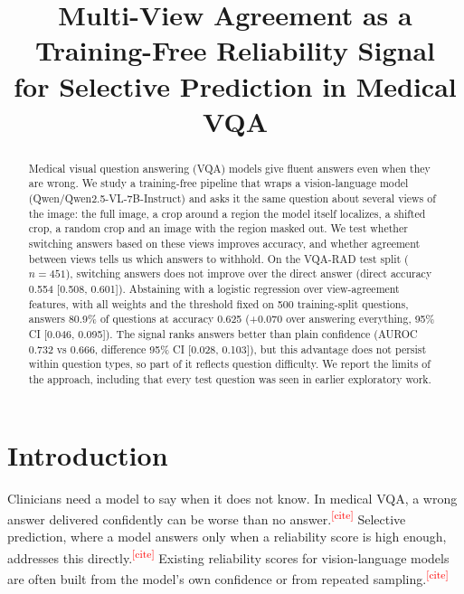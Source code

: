 \documentclass[11pt]{article}
\title{Multi-View Agreement as a Training-Free Reliability Signal\\for Selective Prediction in Medical VQA}
\author{\todo{authors and affiliations}}
\date{}
\newcommand{\needcite}{\textcolor{red}{\textsuperscript{[cite]}}}
\begin{document}
\maketitle

\begin{abstract}
Medical visual question answering (VQA) models give fluent answers even when they are wrong. We study a training-free pipeline that wraps a vision-language model (Qwen/Qwen2.5-VL-7B-Instruct) and asks it the same question about several views of the image: the full image, a crop around a region the model itself localizes, a shifted crop, a random crop and an image with the region masked out. We test whether switching answers based on these views improves accuracy, and whether agreement between views tells us which answers to withhold. On the VQA-RAD test split ($n=451$), switching answers does not improve over the direct answer (direct accuracy 0.554 [0.508, 0.601]). Abstaining with a logistic regression over view-agreement features, with all weights and the threshold fixed on 500 training-split questions, answers 80.9\% of questions at accuracy 0.625 (+0.070 over answering everything, 95\% CI [0.046, 0.095]). The signal ranks answers better than plain confidence (AUROC 0.732 vs 0.666, difference 95\% CI [0.028, 0.103]), but this advantage does not persist within question types, so part of it reflects question difficulty. We report the limits of the approach, including that every test question was seen in earlier exploratory work.
\end{abstract}

\section{Introduction}
Clinicians need a model to say when it does not know. In medical VQA, a wrong answer delivered confidently can be worse than no answer.\needcite{} Selective prediction, where a model answers only when a reliability score is high enough, addresses this directly.\needcite{} Existing reliability scores for vision-language models are often built from the model's own confidence or from repeated sampling.\needcite{}
\end{document}
